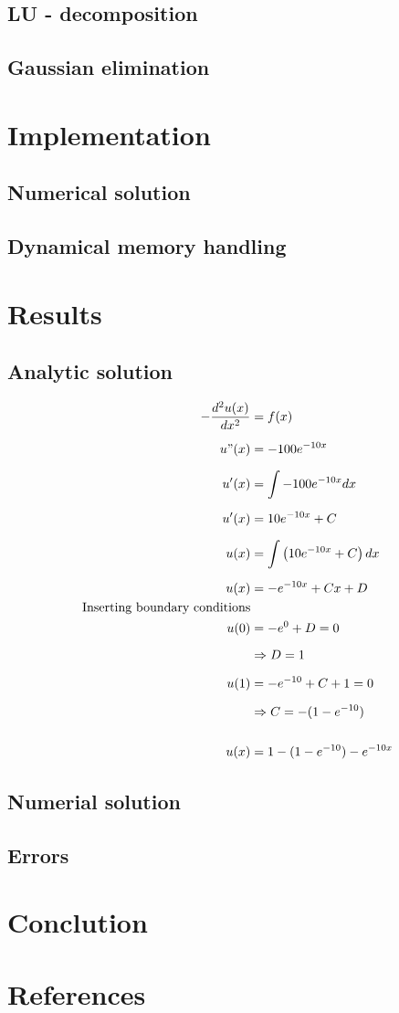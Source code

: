 \documentclass[norsk]{article}
\begin{document}
\subsection{LU - decomposition}
\subsection{Gaussian elimination}
\section{Implementation}
\subsection{Numerical solution}
\subsection{Dynamical memory handling}
\section{Results}
\subsection{Analytic solution}
\begin{align*}
-\frac{d^2u(x)}{dx^2} &= f(x) \\[6pt]
u"(x) &= -100e^{-10x} \\[6pt]
u'(x) &= \int -100e^{-10x} dx\\[6pt]
u'(x) &= 10e^{-10x} + C \\[6pt]
u(x) &= \int \left(10e^{-10x} + C\right) dx \\[6pt]
u(x) &= -e^{-10x} + Cx + D \\
\text{Inserting boundary conditions}\\
u(0) &= -e^0 + D = 0 \\[6pt]
&\Rightarrow D = 1 \\[6pt]
u(1) &= -e^{-10} + C + 1 = 0 \\[6pt]
&\Rightarrow C = -(1 - e^{-10})\\
\\
u(x) &= 1 - (1 - e^{-10}) - e^{-10x}\\
\end{align*}
\subsection{Numerial solution}
\subsection{Errors}
\section{Conclution}

\section{References}
\end{document}
